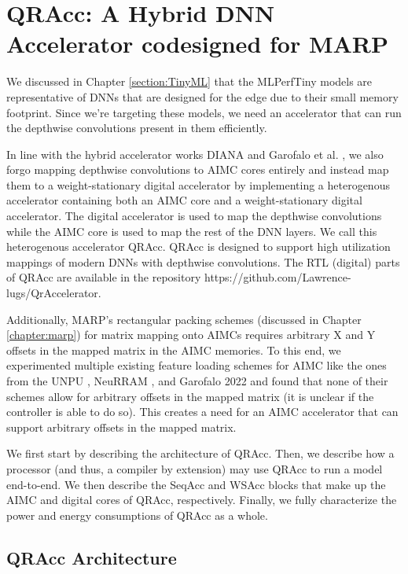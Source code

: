 \chapter{QRAcc: A Hybrid DNN Accelerator codesigned for MARP}

\label{chap:qracc}

We discussed in Chapter \ref{section:TinyML} that the MLPerfTiny models are representative of DNNs that are designed for the edge due to their small memory footprint. Since we're targeting these models, we need an accelerator that can run the depthwise convolutions present in them efficiently.

In line with the hybrid accelerator works DIANA \cite{houshmand2022diana} and Garofalo et al. \cite{garofalo2022heterogeneous}, we also forgo mapping depthwise convolutions to AIMC cores entirely and instead map them to a weight-stationary digital accelerator by implementing a heterogenous accelerator containing both an AIMC core and a weight-stationary digital accelerator. The digital accelerator is used to map the depthwise convolutions while the AIMC core is used to map the rest of the DNN layers. We call this heterogenous accelerator QRAcc. QRAcc is designed to support high utilization mappings of modern DNNs with depthwise convolutions. The RTL (digital) parts of QRAcc are available in the repository https://github.com/Lawrence-lugs/QrAccelerator.

Additionally, MARP's rectangular packing schemes (discussed in Chapter \ref{chapter:marp}) for matrix mapping onto AIMCs requires arbitrary X and Y offsets in the mapped matrix in the AIMC memories. To this end, we experimented multiple existing feature loading schemes for AIMC like the ones from the UNPU \cite{lee2018unpu}, NeuRRAM \cite{wanneurram}, and Garofalo 2022 \cite{garofalo2022heterogeneous} and found that none of their schemes allow for arbitrary offsets in the mapped matrix (it is unclear if the controller is able to do so). This creates a need for an AIMC accelerator that can support arbitrary offsets in the mapped matrix.

We first start by describing the architecture of QRAcc. Then, we describe how a processor (and thus, a compiler by extension) may use QRAcc to run a model end-to-end. We then describe the SeqAcc and WSAcc blocks that make up the AIMC and digital cores of QRAcc, respectively. Finally, we fully characterize the power and energy consumptions of QRAcc as a whole. 

\section{QRAcc Architecture}

